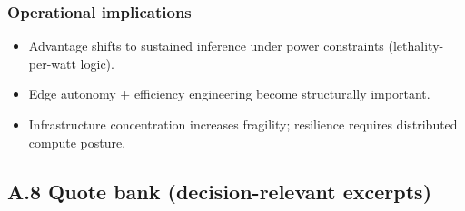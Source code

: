 \documentclass[
]{article}
\providecommand{\tightlist}{%
  \setlength{\itemsep}{0pt}\setlength{\parskip}{0pt}}
\begin{document}
\hypertarget{operational-implications-6}{%
\subsubsection{Operational
implications}\label{operational-implications-6}}

\begin{itemize}
\tightlist
\item
  Advantage shifts to sustained inference under power constraints
  (lethality-per-watt logic).
\item
  Edge autonomy + efficiency engineering become structurally important.
\item
  Infrastructure concentration increases fragility; resilience requires
  distributed compute posture.
\end{itemize}

\hypertarget{a.8-quote-bank-decision-relevant-excerpts}{%
\subsection{A.8 Quote bank (decision-relevant
excerpts)}\label{a.8-quote-bank-decision-relevant-excerpts}}
\end{document}
